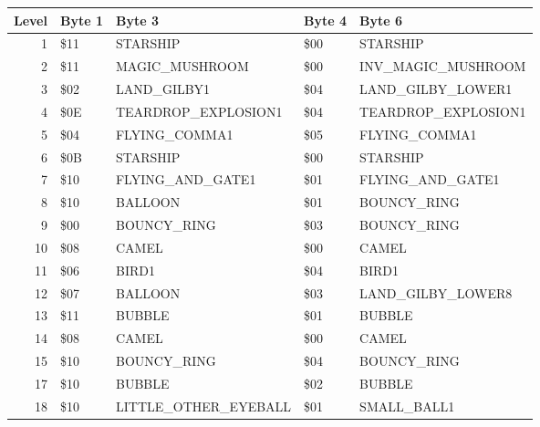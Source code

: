 \begin{figure}[H]
  {
  \setlength{\tabcolsep}{3.0pt}
  \setlength\cmidrulewidth{\heavyrulewidth} %
  \begin{adjustbox}{width=\textwidth}

\begin{tabular}{rllll}
\toprule
   Level & Byte 1    & Byte 3               & Byte 4    & Byte 6                  \\
\midrule
       1 & \$11       & STARSHIP             & \$00       & STARSHIP                \\
       2 & \$11       & MAGIC\_MUSHROOM       & \$00       & INV\_MAGIC\_MUSHROOM      \\
       3 & \$02       & LAND\_GILBY1          & \$04       & LAND\_GILBY\_LOWER1 \\
       4 & \$0E       & TEARDROP\_EXPLOSION1  & \$04       & TEARDROP\_EXPLOSION1     \\
       5 & \$04       & FLYING\_COMMA1        & \$05       & FLYING\_COMMA1           \\
       6 & \$0B       & STARSHIP             & \$00       & STARSHIP                \\
       7 & \$10       & FLYING\_AND\_GATE1    & \$01       & FLYING\_AND\_GATE1       \\
       8 & \$10       & BALLOON              & \$01       & BOUNCY\_RING             \\
       9 & \$00       & BOUNCY\_RING          & \$03       & BOUNCY\_RING             \\
      10 & \$08       & CAMEL                & \$00       & CAMEL                   \\
      11 & \$06       & BIRD1                & \$04       & BIRD1                   \\
      12 & \$07       & BALLOON              & \$03       & LAND\_GILBY\_LOWER8 \\
      13 & \$11       & BUBBLE               & \$01       & BUBBLE                  \\
      14 & \$08       & CAMEL                & \$00       & CAMEL                   \\
      15 & \$10       & BOUNCY\_RING          & \$04       & BOUNCY\_RING             \\
      17 & \$10       & BUBBLE               & \$02       & BUBBLE                  \\
      18 & \$10       & LITTLE\_OTHER\_EYEBALL & \$01       & SMALL\_BALL1             \\

\end{tabular}
\end{adjustbox}}
\end{figure}
